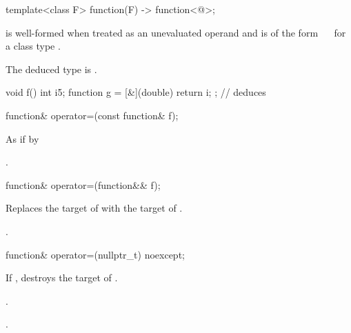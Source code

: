 \begin{itemdecl}
template<class F> function(F) -> function<@\seebelow@>;
\end{itemdecl}

\begin{itemdescr}
\pnum
\constraints
{} is well-formed when treated as an unevaluated operand and
 is of the form
~\cv{}~
for a class type .

\pnum
\remarks
The deduced type is .

\pnum
\begin{example}
\begin{codeblock}
void f() {
  int i{5};
  function g = [&](double) { return i; };       // deduces 
}
\end{codeblock}
\end{example}
\end{itemdescr}

%
\begin{itemdecl}
function& operator=(const function& f);
\end{itemdecl}

\begin{itemdescr}
\pnum
\effects
As if by 

\pnum
\returns
{}.
\end{itemdescr}

%
\begin{itemdecl}
function& operator=(function&& f);
\end{itemdecl}

\begin{itemdescr}
\pnum
\effects
Replaces the target of 
with the target of .

\pnum
\returns
{}.
\end{itemdescr}

%
\begin{itemdecl}
function& operator=(nullptr_t) noexcept;
\end{itemdecl}

\begin{itemdescr}
\pnum
\effects
If , destroys the target of .

\pnum
\ensures
{}.

\pnum
\returns
{}.
\end{itemdescr}

